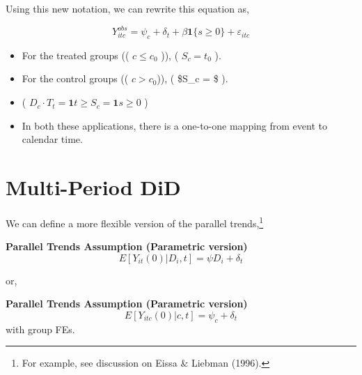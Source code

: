 \documentclass[
  letterpaper,
  DIV=11,
  numbers=noendperiod]{scrreprt}
\providecommand{\tightlist}{%
  \setlength{\itemsep}{0pt}\setlength{\parskip}{0pt}}\usepackage{longtable,booktabs,array}
\theoremstyle{definition}
\theoremstyle{remark}
\begin{document}
\begin{enumerate}
  Using this new notation, we can rewrite this equation as,

  \[
  Y^{obs}_{itc} = \psi_c + \delta_t + \beta \mathbf{1}\{s \geq 0\} + \varepsilon_{itc}
  \]

  \begin{itemize}
  \tightlist
  \item
    For the treated groups (( \(c \leq c_0\) )), ( \(S_c = t_0\) ).
  \item
    For the control groups (( \(c > c_0\))), ( \$S\_c = \infty\$ ).
  \item
    ( \(D_c \cdot T_t = \mathbf{1}{t \geq S_c} = \mathbf{1}{s \geq 0}\)
    )
  \item
    In both these applications, there is a one-to-one mapping from event
    to calendar time.
  \end{itemize}

  \chapter{Multi-Period DiD}\label{multi-period-did}

  We can define a more flexible version of the parallel
  trends,\footnote{For example, see discussion on Eissa \& Liebman
    (1996).}

  \begin{tcolorbox}[enhanced jigsaw, bottomrule=.15mm, coltitle=black, arc=.35mm, left=2mm, opacityback=0, leftrule=.75mm, colbacktitle=quarto-callout-note-color!10!white, title={Note}, toprule=.15mm, bottomtitle=1mm, breakable, colframe=quarto-callout-note-color-frame, opacitybacktitle=0.6, titlerule=0mm, colback=white, rightrule=.15mm, toptitle=1mm]

  \textbf{Parallel Trends Assumption (Parametric version)}\\
  \[
  E[Y_{it}(0)|D_i, t] = \psi D_i + \delta_t
  \]

  \end{tcolorbox}

  or,

  \begin{tcolorbox}[enhanced jigsaw, bottomrule=.15mm, coltitle=black, arc=.35mm, left=2mm, opacityback=0, leftrule=.75mm, colbacktitle=quarto-callout-note-color!10!white, title={Note}, toprule=.15mm, bottomtitle=1mm, breakable, colframe=quarto-callout-note-color-frame, opacitybacktitle=0.6, titlerule=0mm, colback=white, rightrule=.15mm, toptitle=1mm]

  \textbf{Parallel Trends Assumption (Parametric version)}\\
  \[
  E[Y_{itc}(0)|c, t] = \psi_c + \delta_t
  \] with group FEs.


\end{tcolorbox}
\end{enumerate}
\end{document}
